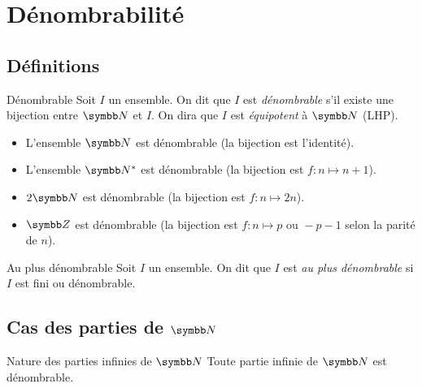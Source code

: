 \section{Dénombrabilité}
\subsection{Définitions}

\begin{definition}{Dénombrable}{}
    Soit $I$ un ensemble. On dit que $I$ est \emph{dénombrable} 
    s'il existe une bijection entre $\N$ et $I$.
    On dira que $I$ est \emph{équipotent} à $\N$ (LHP).
\end{definition}

\begin{exemple}
    \begin{itemize}
        \item L'ensemble $\N$ est dénombrable (la bijection est l'identité).
        \item L'ensemble $\N^*$ est dénombrable (la bijection est $f : n \mapsto n+1$).
        \item $2 \N$ est dénombrable (la bijection est $f : n \mapsto 2n$).
        \item $\Z$ est dénombrable (la bijection est $f : n \mapsto p \text{ ou } -p-1$ selon la parité de $n$).
    \end{itemize}
\end{exemple}

\begin{definition}{Au plus dénombrable}{}
    Soit $I$ un ensemble. On dit que $I$ est \emph{au plus dénombrable} si $I$ est 
    fini ou dénombrable.
\end{definition}

\subsection{Cas des parties de \texorpdfstring{$\N$}{N}}

\begin{theoreme}{Nature des parties infinies de $\N$}{}
    Toute partie infinie de $\N$ est dénombrable.
\end{theoreme}


